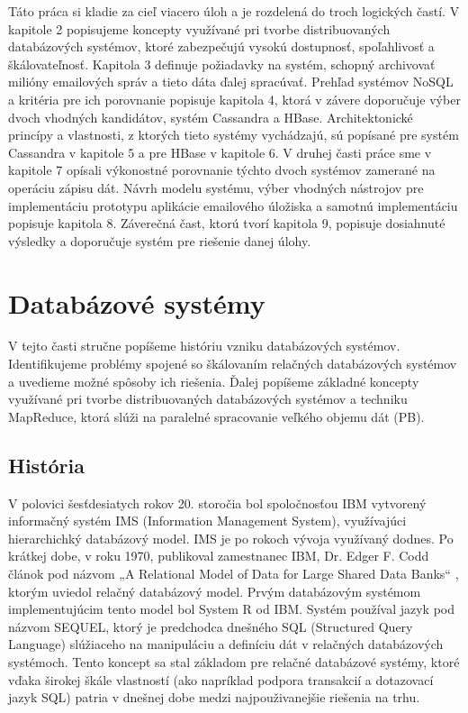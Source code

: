 \documentclass[11pt,twoside,a4paper]{book}
\begin{document}
Táto práca si kladie za cieľ viacero úloh a je rozdelená do troch logických častí. V kapitole 2 popisujeme koncepty využívané pri tvorbe distribuovaných databázových systémov, ktoré zabezpečujú vysokú dostupnosť, spoľahlivosť a škálovateľnosť. Kapitola 3 definuje požiadavky na systém, schopný archivovať milióny emailových správ a tieto dáta ďalej spracúvať. Prehľad systémov NoSQL a kritéria pre ich porovnanie popisuje kapitola 4, ktorá v závere doporučuje výber dvoch vhodných kandidátov, systém Cassandra a HBase. Architektonické princípy a vlastnosti, z ktorých tieto systémy vychádzajú, sú popísané pre systém Cassandra v kapitole 5 a pre HBase v kapitole 6.
V druhej časti práce sme v kapitole 7 opísali výkonostné porovnanie týchto dvoch systémov zamerané na operáciu zápisu dát. Návrh modelu systému, výber vhodných nástrojov pre implementáciu prototypu aplikácie emailového úložiska a samotnú implementáciu popisuje kapitola 8. 
Záverečná čast, ktorú tvorí kapitola 9, popisuje dosiahnuté výsledky a doporučuje systém pre riešenie danej úlohy.







\chapter{Databázové systémy}

V tejto časti stručne popíšeme históriu vzniku databázových systémov. Identifikujeme problémy spojené so škálovaním relačných databázových systémov a uvedieme možné spôsoby ich riešenia. Ďalej popíšeme základné koncepty využívané pri tvorbe distribuovaných databázových systémov a techniku MapReduce, ktorá slúži na paralelné spracovanie veľkého objemu dát (PB).

\section{História}

V polovici šesťdesiatych rokov 20. storočia bol spoločnosťou IBM vytvorený informačný systém IMS (Information Management System), využívajúci hierarchichký databázový model. IMS je po rokoch vývoja využívaný dodnes. Po krátkej dobe, v roku 1970, publikoval zamestnanec IBM, Dr. Edger F. Codd článok pod názvom „A Relational Model of Data for Large Shared Data Banks“ \cite{Codd:1970:RMD:362384.362685}, ktorým uviedol relačný databázový model. Prvým databázovým systémom implementujúcim tento model bol System R od IBM. Systém používal jazyk pod názvom SEQUEL, ktorý je predchodca dnešného SQL (Structured Query Language) slúžiaceho na manipuláciu a definíciu dát v relačných databázových systémoch. Tento koncept sa stal základom pre relačné databázové systémy, ktoré vďaka širokej škále vlastností (ako napríklad podpora transakcií a dotazovací jazyk SQL) patria v dnešnej  dobe medzi najpouživanejšie riešenia na trhu.
\end{document}
